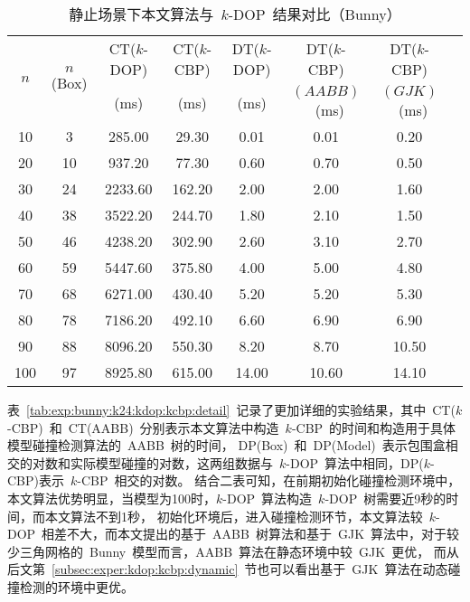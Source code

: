 \begin{table}[!ht]  
\centering
\caption{静止场景下本文算法与~$k$-DOP~结果对比（Bunny）}
\label{tab:exp:bunny:k24:kdop:kcbp}
\begin{tabular}{cccccccc}
\toprule[1.5pt]
\multirow{2}{*}{$n$} & \multirow{2}{*}{$n$(Box)} & CT($k$-DOP) &  CT($k$-CBP) & DT($k$-DOP) & DT($k$-CBP) & DT($k$-CBP) \\%
                     &                         &  (ms)        & (ms)         & (ms)        & $(AABB)$~(ms) & $(GJK)$~(ms)       \\
\midrule[1.0pt]
10 & 3 &	285.00 &	29.30      &0.01 &	0.01  & 	0.20  \\ %
20 & 10&	937.20 &	77.30      &0.60 &	0.70  & 	0.50  \\ %
30 & 24&	2233.60&	162.20     &2.00 &	2.00  & 	1.60  \\ %
40 & 38&	3522.20&	244.70     &1.80 &	2.10  & 	1.50  \\ %
50 & 46&	4238.20&	302.90     &2.60 &	3.10  & 	2.70  \\ %
60 & 59&	5447.60&	375.80     &4.00 &	5.00  & 	4.80  \\ %
70 & 68&	6271.00&	430.40     &5.20 &	5.20  & 	5.30  \\ %
80 & 78&	7186.20&	492.10     &6.60 &	6.90  & 	6.90  \\ %
90 & 88&	8096.20&	550.30     &8.20 &	8.70  & 	10.50 \\ %
100& 97&	8925.80&	615.00     &14.00&	10.60 & 	14.10 \\ %
\bottomrule[1.5pt]
\end{tabular}
\end{table}

表~\ref{tab:exp:bunny:k24:kdop:kcbp:detail}~记录了更加详细的实验结果，其中~CT($k$-CBP)~和~CT(AABB)~分别表示本文算法中构造~$k$-CBP~的时间和构造用于具体模型碰撞检测算法的~AABB~树的时间，
DP(Box)~和~DP(Model)~表示包围盒相交的对数和实际模型碰撞的对数，这两组数据与~$k$-DOP~算法中相同，DP($k$-CBP)表示~$k$-CBP~相交的对数。
结合二表可知，在前期初始化碰撞检测环境中，本文算法优势明显，当模型为100时，$k$-DOP~算法构造~$k$-DOP~树需要近9秒的时间，而本文算法不到1秒，
初始化环境后，进入碰撞检测环节，本文算法较~$k$-DOP~相差不大，而本文提出的基于~AABB~树算法和基于~GJK~算法中，对于较少三角网格的~Bunny~模型而言，AABB~算法在静态环境中较~GJK~更优，
而从后文第~\ref{subsec:exper:kdop:kcbp:dynamic}~节也可以看出基于~GJK~算法在动态碰撞检测的环境中更优。 


